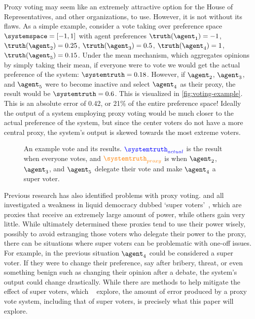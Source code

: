 Proxy voting may seem like an extremely attractive option for the House of
Representatives, and other organizations, to use.
However, it is not without its flaws.
As a simple example, consider a vote taking over preference
space $\systemspace = [-1, 1]$ with agent preferences $\truthof{\agent_1} = -1$,
$\truthof{\agent_2} = 0.25$, $\truthof{\agent_3} = 0.5$, $\truthof{\agent_4} = 1$,
$\truthof{\agent_5} = 0.15$.
Under the mean mechanism, which aggregates opinions by simply taking their mean, if
everyone were to vote we would get the actual preference of the
system: $\systemtruth = 0.18$.
However, if $\agent_2$, $\agent_3$, and $\agent_5$ were to become inactive and select
$\agent_4$ as their proxy, the result would be $\systemtruth = 0.6$.
This is visualized in \autoref{fig:voting-example}.
This is an absolute error of 0.42, or 21\% of the entire preference space!
Ideally the output of a system employing proxy voting would be much closer to the
actual preference of the system, but since the center voters do not have a more
central proxy, the system's output is skewed towards the most extreme voters.

\begin{figure}[htbp]
    \centering
    
    \caption{
        An example vote and its results.
        $\textcolor{blue}{\systemtruth_{actual}}$ is the result when everyone votes,
        and $\textcolor{orange}{\systemtruth_{proxy}}$ is when $\agent_2$, $\agent_3$,
        and $\agent_5$ delegate their vote and make $\agent_4$ a super voter.
    }
    \label{fig:voting-example}
\end{figure}

Previous research has also identified problems with proxy voting.
 and  all investigated a weakness in liquid democracy dubbed
`super voters'~\cite{Kling2015,Golz2021}, which are proxies that receive an extremely
large amount of power, while others gain very little.
While  ultimately determined these proxies tend to use their power
wisely, possibly to avoid estranging those voters who delegate their power to the
proxy, there can be situations where super voters can be problematic with one-off
issues.
For example, in the previous situation $\agent_4$ could be considered a super voter.
If they were to change their preference, say after bribery, threat, or even
something benign such as changing their opinion after a debate, the system's output
could change drastically.
While there are methods to help mitigate the effect of super voters, which
~\cite{Golz2021} explore, the amount of error produced by a proxy vote
system, including that of super voters, is precisely what this paper will explore.


